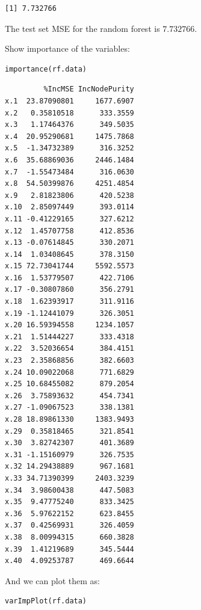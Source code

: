 \documentclass[twoside,11pt]{homework}
\begin{document}
\begin{enumerate}
\begin{verbatim}
[1] 7.732766

\end{verbatim}

The test set MSE for the random forest is $7.732766$.

Show importance of the variables:

\begin{lstlisting}
importance(rf.data)
\end{lstlisting}

\begin{verbatim}
         %IncMSE IncNodePurity
x.1  23.87090801     1677.6907
x.2   0.35810518      333.3559
x.3   1.17464376      349.5035
x.4  20.95290681     1475.7868
x.5  -1.34732389      316.3252
x.6  35.68869036     2446.1484
x.7  -1.55473484      316.0630
x.8  54.50399876     4251.4854
x.9   2.81823806      420.5238
x.10  2.85097449      393.0114
x.11 -0.41229165      327.6212
x.12  1.45707758      412.8536
x.13 -0.07614845      330.2071
x.14  1.03408645      378.3150
x.15 72.73041744     5592.5573
x.16  1.53779507      422.7106
x.17 -0.30807860      356.2791
x.18  1.62393917      311.9116
x.19 -1.12441079      326.3051
x.20 16.59394558     1234.1057
x.21  1.51444227      333.4318
x.22  3.52036654      384.4151
x.23  2.35868856      382.6603
x.24 10.09022068      771.6829
x.25 10.68455082      879.2054
x.26  3.75893632      454.7341
x.27 -1.09067523      338.1381
x.28 18.89861330     1383.9493
x.29  0.35818465      321.8541
x.30  3.82742307      401.3689
x.31 -1.15160979      326.7535
x.32 14.29438889      967.1681
x.33 34.71390399     2403.3239
x.34  3.98600438      447.5083
x.35  9.47775240      833.3425
x.36  5.97622152      623.8455
x.37  0.42569931      326.4059
x.38  8.00994315      660.3828
x.39  1.41219689      345.5444
x.40  4.09253787      469.6644
\end{verbatim}

And we can plot them as:

\begin{lstlisting}
varImpPlot(rf.data)
\end{lstlisting}


\end{enumerate}
\end{document}
